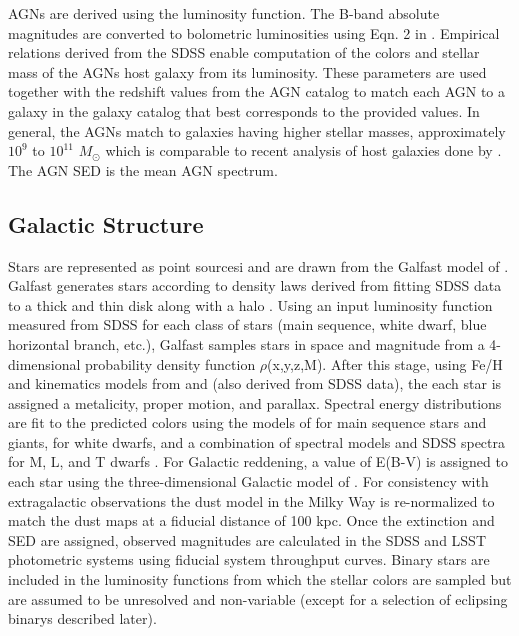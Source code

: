 \documentclass[]{article}
\begin{document}
{AGNs are derived using the \citet{bongiorno12} luminosity function. The
B-band absolute magnitudes are converted to bolometric luminosities
using Eqn. 2 in \citet{hopkins07}. Empirical relations derived from the
SDSS enable computation of the colors and stellar mass of the AGNs
host galaxy from its luminosity. These parameters are used together
with the redshift values from the AGN catalog to match each AGN to a
galaxy in the galaxy catalog that best corresponds to the provided
values. In general, the AGNs match to galaxies having higher stellar
masses, approximately $10^{9}$ to $10^{11}$ $M_{\odot}$ which is
comparable to recent analysis of host galaxies done by \citet{xue11}. The
AGN SED is the \citet{vandenberk} mean AGN spectrum. 

\subsection{Galactic Structure \label{sec:stars}}

Stars are represented as point sourcesi and are drawn from the Galfast model of \citep{galfast}.  
Galfast generates stars according to
density laws  derived from fitting SDSS data
to a thick and thin disk along with a halo \citep{juric}. Using an 
input luminosity function measured from SDSS for each class of stars 
(main sequence, white dwarf, blue horizontal branch, etc.), Galfast samples stars in space and magnitude 
from a 4-dimensional probability density function
$\rho$(x,y,z,M). After this stage, using Fe/H and kinematics models
from \citet{ivezic08} and \citet{bond09} (also derived from SDSS data), 
the each star is assigned a metalicity, proper motion, and parallax.
Spectral energy distributions are fit to the predicted
colors using the models of \citet{kurucz93} for main sequence
stars and giants, \citet{bergeron95} for white dwarfs,
and a combination of spectral models and SDSS spectra for M, L, and T
dwarfs 
\citep[e.g.][]{cushing05,bochanski07,burrows06,pettersen89,kowalski10}. 
For Galactic reddening, a value of E(B-V) is assigned to each
star using the three-dimensional Galactic model of 
\citet{amores05}. For consistency with extragalactic observations the
dust model in the Milky Way is re-normalized to match the 
\citet{schlegel98} dust maps at a fiducial distance of 100 kpc.  Once the 
extinction and SED are assigned, observed magnitudes are calculated in
the SDSS and LSST photometric systems using fiducial system throughput curves.
Binary stars are included in the luminosity functions from which the
stellar colors are sampled but are assumed to be unresolved and
non-variable (except for a selection of eclipsing binarys described
later).

}
\end{document}
